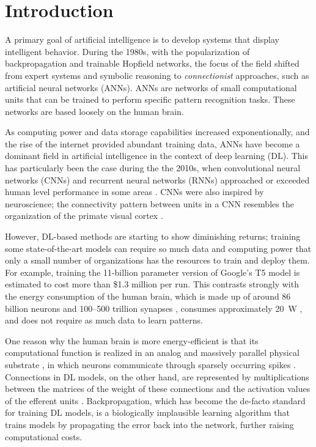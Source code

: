 \chapter{Introduction}\label{ch:introduction}

A primary goal of artificial intelligence is to develop systems that display intelligent behavior.
During the 1980s, with the popularization of backpropagation and trainable Hopfield networks, the focus of the field shifted from expert systems and symbolic reasoning to \emph{connectionist} approaches, such as artificial neural networks (ANNs).
ANNs are networks of small computational units that can be trained to perform specific pattern recognition tasks.
These networks are based loosely on the human brain.

As computing power and data storage capabilities increased exponentionally, and the rise of the internet provided abundant training data, ANNs have become a dominant field in artificial intelligence in the context of deep learning (DL).
This has particularly been the case during the the 2010s, when convolutional neural networks (CNNs) and recurrent neural networks (RNNs) approached or exceeded human level performance in some areas \citep{schmidhuber2015deep}.
CNNs were also inspired by neuroscience; the connectivity pattern between units in a CNN resembles the organization of the primate visual cortex \citep{hubel1968receptive}.

However, DL-based methods are starting to show diminishing returns; training some state-of-the-art models can require so much data and computing power that only a small number of organizations has the resources to train and deploy them.
For example, training the 11-billion parameter version of Google's T5 model \citep{raffel2019exploring} is estimated to cost more than \$1.3 million per run\citep{sharir2020cost}.
This contrasts strongly with the energy consumption of the human brain, which is made up of around 86 billion neurons \citep{azevedo2009equal} and 100--500 trillion synapses \citep{drachman2005we}, consumes approximately \SI{20}{\watt} \citep{sokoloff1960metabolism}, and does not require as much data to learn patterns.

One reason why the human brain is more energy-efficient is that its computational function is realized in an analog and massively parallel physical substrate \citep{a2017parallel}, in which neurons communicate through sparsely occurring spikes \citep{bear2020neuroscience}.
Connections in DL models, on the other hand, are represented by multiplications between the matrices of the weight of these connections and the activation values of the efferent units \citep{lecun2015deep}.
Backpropagation, which has become the de-facto standard for training DL models, is a biologically implausible learning algorithm that trains models by propagating the error back into the network, further raising computational costs.

